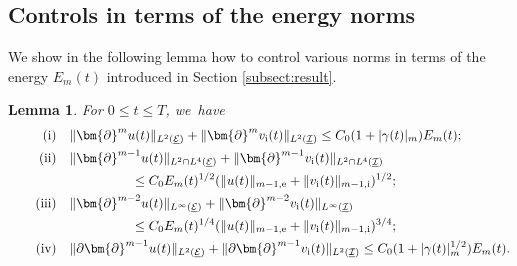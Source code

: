 \documentclass[10pt]{amsart}
\newcommand{\cI}{{\mathcal I}}
\newcommand{\cE}{{\mathcal E}}
\newcommand{\ul}[1]{\underline{#1}}
\newtheorem{lemma}[theorem]{Lemma}
\theoremstyle{definition}
\begin{document}
\subsection{Controls in terms of the energy norms}\label{sectCEN}
We show in the following lemma how to control various norms in terms of the energy $E_m(t)$ introduced in Section \ref{subsect:result}.

\begin{lemma}\label{lem:EstDuv}
For $0\leq t\leq T$, we~have\enlargethispage{\baselineskip}
\begin{align*}
\tag{i}\label{lem:EstDuvi} &\quad
\|\bm{\partial}^m u(t)\|_{L^2(\ul{\cE})} + \|\bm{\partial}^m v_\mathrm{i}(t)\|_{L^2(\ul{\cI})} \leq C_0(1+|\gamma(t)|_m)E_m(t); \\
\tag{ii}\label{lem:EstDuvii} &\quad
\|\bm{\partial}^{m-1} u(t)\|_{L^2\cap L^4(\ul{\cE})} + \|\bm{\partial}^{m-1} v_\mathrm{i}(t)\|_{L^2\cap L^4(\ul{\cI})} \\
&\hspace{2cm} \leq C_0 E_m(t)^{1/2} (\|u(t)\|_{m-1,{\rm e}} + \|v_\mathrm{i}(t)\|_{m-1,{\rm i}})^{1/2}; \\
\tag{iii}\label{lem:EstDuviii} &\quad
\|\bm{\partial}^{m-2} u(t)\|_{L^\infty(\ul{\cE})} + \|\bm{\partial}^{m-2} v_\mathrm{i}(t)\|_{L^\infty(\ul{\cI})} \\
&\hspace{2cm} \leq C_0 E_m(t)^{1/4} (\|u(t)\|_{m-1,{\rm e}} + \|v_\mathrm{i}(t)\|_{m-1,{\rm i}})^{3/4}; \\
\tag{iv}\label{lem:EstDuviv} &\quad
\|\partial\bm{\partial}^{m-1} u(t)\|_{L^2(\ul{\cE})} + \|\partial\bm{\partial}^{m-1} v_\mathrm{i}(t)\|_{L^2(\ul{\cI})} \leq C_0(1+|\gamma(t)|_m^{1/2})E_m(t).
\end{align*}
\end{lemma}
\end{document}
